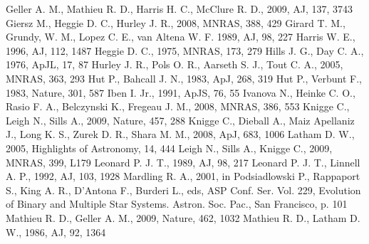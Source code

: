 \begin{thebibliography}{99}
  Geller A. M., Mathieu R. D., Harris H. C., McClure R. D., 2009,
  AJ, 137, 3743 
  Giersz M., Heggie D. C., Hurley J. R., 2008, MNRAS, 388, 429
  Girard T. M., Grundy, W. M., Lopez C. E., van Altena W. F. 1989, AJ,
  98, 227
  Harris W. E., 1996, AJ, 112, 1487
 Heggie
  D. C., 1975, MNRAS, 173, 279 
 Hills
  J. G., Day C. A., 1976, ApJL, 17, 87
  Hurley J. R., Pols O. R., Aarseth S. J., Tout C. A., 2005,
  MNRAS, 363, 293 
 Hut
  P., Bahcall J. N., 1983, ApJ, 268, 319
 Hut
  P., Verbunt F., 1983, Nature, 301, 587
 Iben
  I. Jr., 1991, ApJS, 76, 55 
  Ivanova N., Heinke C. O., Rasio F. A., Belczynski K., Fregeau
  J. M., 2008, MNRAS, 386, 553
 Knigge C., Leigh N., Sills A., 2009,
  Nature, 457, 288
  Knigge C., Dieball A., Maiz Apellaniz J., Long K. S., Zurek
  D. R., Shara M. M., 2008, ApJ, 683, 1006
 Latham
  D. W., 2005, Highlights of Astronomy, 14, 444 
 Leigh
  N., Sills A., Knigge C., 2009, MNRAS, 399, L179
 Leonard
  P. J. T., 1989, AJ, 98, 217
 Leonard
  P. J. T., Linnell A. P., 1992, AJ, 103, 1928
  Mardling R. A., 2001, in Podsiadlowski P., Rappaport S.,
  King A. R., D'Antona F., Burderi L., eds, ASP Conf. Ser. Vol. 229, Evolution of Binary
  and Multiple Star Systems. Astron. Soc. Pac., San Francisco, p. 101
  Mathieu R. D., Geller A. M., 2009, Nature, 462, 1032 
  Mathieu R. D., Latham D. W., 1986, AJ, 92, 1364 

\end{thebibliography}

